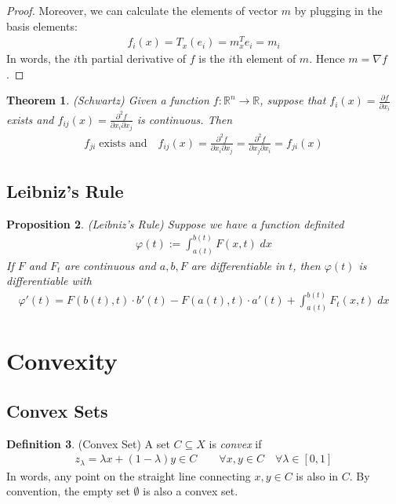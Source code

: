 \documentclass[12pt]{book}
\numberwithin{equation}{section} %
\theoremstyle{plain}
\newtheorem{thm}{Theorem}[section]
\newtheorem{prop}[thm]{Proposition}
\theoremstyle{definition}
\newtheorem{defn}[thm]{Definition}
\theoremstyle{remark}
\newcommand{\R}{\mathbb{R}}
\newcommand{\Rn}{\mathbb{R}^n}
\begin{document}
\begin{proof}
Moreover, we can calculate the elements of vector $m$ by plugging in the
basis elements:
\begin{align*}
  f_i(x) = T_x(e_i) = m^T_x e_i = m_i
\end{align*}
In words, the $i$th partial derivative of $f$ is the $i$th element of
$m$. Hence $m = \nabla f$.
\end{proof}

\begin{thm}{\emph{(Schwartz)}}
Given a function $f:\Rn\rightarrow\R$, suppose that
$f_i(x)=\frac{\partial f}{\partial x_i}$ exists and
$f_{ij}(x)=\frac{\partial^2 f}{\partial x_i\partial x_j}$ is continuous.
Then
\begin{align*}
  f_{ji} \; \text{exists and} \quad
  f_{ij}(x)=\frac{\partial^2 f}{\partial x_i\partial x_j}
  = \frac{\partial^2 f}{\partial x_j\partial x_i} = f_{ji}(x)
\end{align*}
\end{thm}

\clearpage
\subsection{Leibniz's Rule}

\begin{prop}\emph{(Leibniz's Rule)}
Suppose we have a function definited
\begin{align*}
  \varphi(t) := \int^{b(t)}_{a(t)} F(x,t) \; dx
\end{align*}
If $F$ and $F_t$ are continuous and $a,b,F$ are differentiable in $t$,
then $\varphi(t)$ is differentiable with
\begin{align*}
  \varphi'(t)
  = F(b(t),t)\cdot b'(t) - F(a(t),t)\cdot a'(t)
  + \int^{b(t)}_{a(t)} F_t(x,t) \; dx
\end{align*}
\end{prop}



\section{Convexity}

\subsection{Convex Sets}

\begin{defn}{(Convex Set)}
\label{defn:convexset}
A set $C\subseteq X$ is \emph{convex} if
\begin{align*}
  z_\lambda = \lambda x + (1-\lambda) y \in C
  \qquad \forall x,y\in C\quad \forall \lambda \in [0,1]
\end{align*}
In words, any point on the straight line connecting $x,y\in C$ is also
in $C$. By convention, the empty set $\emptyset$ is also a convex set.
\end{defn}
\end{document}
